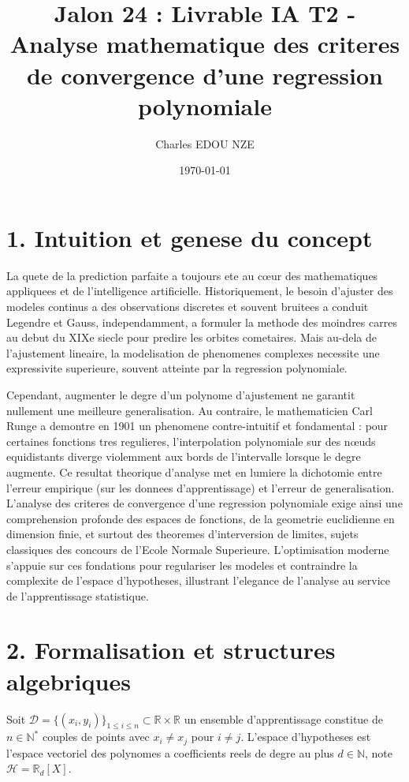 \documentclass[11pt,a4paper]{report}
\title{Jalon 24 : Livrable IA T2 - Analyse mathematique des criteres de convergence d'une regression polynomiale}
\author{Charles EDOU NZE}
\date{\today}
\begin{document}
\maketitle
\tableofcontents

\section{1. Intuition et genese du concept}

La quete de la prediction parfaite a toujours ete au cœur des mathematiques appliquees et de l'intelligence artificielle. Historiquement, le besoin d'ajuster des modeles continus a des observations discretes et souvent bruitees a conduit Legendre et Gauss, independamment, a formuler la methode des moindres carres au debut du XIXe siecle pour predire les orbites cometaires. Mais au-dela de l'ajustement lineaire, la modelisation de phenomenes complexes necessite une expressivite superieure, souvent atteinte par la regression polynomiale.

Cependant, augmenter le degre d'un polynome d'ajustement ne garantit nullement une meilleure generalisation. Au contraire, le mathematicien Carl Runge a demontre en 1901 un phenomene contre-intuitif et fondamental : pour certaines fonctions tres regulieres, l'interpolation polynomiale sur des nœuds equidistants diverge violemment aux bords de l'intervalle lorsque le degre augmente. Ce resultat theorique d'analyse met en lumiere la dichotomie entre l'erreur empirique (sur les donnees d'apprentissage) et l'erreur de generalisation. L'analyse des criteres de convergence d'une regression polynomiale exige ainsi une comprehension profonde des espaces de fonctions, de la geometrie euclidienne en dimension finie, et surtout des theoremes d'interversion de limites, sujets classiques des concours de l'Ecole Normale Superieure. L'optimisation moderne s'appuie sur ces fondations pour regulariser les modeles et contraindre la complexite de l'espace d'hypotheses, illustrant l'elegance de l'analyse au service de l'apprentissage statistique.

\section{2. Formalisation et structures algebriques}

Soit $\mathcal{D} = \{(x_i, y_i)\}_{1 \le i \le n} \subset \mathbb{R} \times \mathbb{R}$ un ensemble d'apprentissage constitue de $n \in \mathbb{N}^*$ couples de points avec $x_i \neq x_j$ pour $i \neq j$. L'espace d'hypotheses est l'espace vectoriel des polynomes a coefficients reels de degre au plus $d \in \mathbb{N}$, note $\mathcal{H} = \mathbb{R}_d[X]$.
\end{document}
